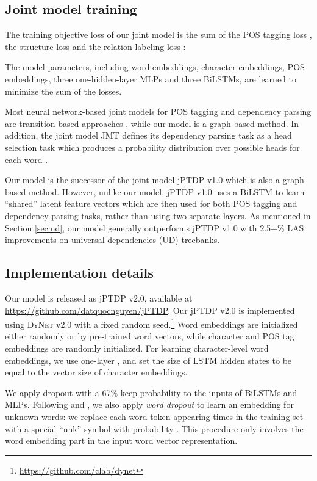\documentclass[11pt,letterpaper]{article}
\begin{document}
\subsection{Joint model training}

The  training objective loss of our joint model is  the sum of the
POS tagging loss , the structure loss  and
the  relation labeling loss : 



\noindent The model parameters, including word embeddings, character
embeddings, POS  embeddings, three one-hidden-layer MLPs and three BiLSTMs, are
learned  to minimize the sum   of the losses.

Most neural network-based joint models for  POS tagging and dependency parsing are transition-based approaches \citep{alberti-EtAl:2015:EMNLP,zhang-weiss:2016:P16-1,YangZLSYF18}, while our model is a graph-based method. In addition, the joint model JMT \citep{hashimoto-EtAl:2017:EMNLP2017} defines its dependency parsing task as a head selection task which produces a probability distribution over possible heads for each word \citep{zhang-cheng-lapata:2017:EACLlong}. 

Our   model is the successor of the joint model jPTDP v1.0 \citep{nguyen-dras-johnson:2017:K17-3} which is also  a graph-based method.  However, unlike our  model, jPTDP v1.0 uses a BiLSTM to learn ``shared'' latent feature vectors which are then used for both  POS tagging and dependency parsing tasks, 
rather than using two separate layers.
As mentioned in Section \ref{sec:ud}, our  model generally outperforms jPTDP v1.0 with 2.5+\% LAS  improvements on universal dependencies (UD) treebanks.

\subsection{Implementation details}\label{ssec:implement}

Our model  is released as jPTDP v2.0, available  at \url{https://github.com/datquocnguyen/jPTDP}. Our jPTDP v2.0 is implemented using  \textsc{DyNet} v2.0 \citep{dynet} with a fixed random seed.\footnote{\url{https://github.com/clab/dynet}}  Word embeddings are initialized either randomly or by pre-trained word vectors, while character and POS tag embeddings are randomly initialized. For learning character-level word embeddings, we use one-layer , and  set the size of LSTM hidden states  to be equal to the vector size of character embeddings.  

We  apply dropout \citep{JMLR:v15:srivastava14a} with a 67\% keep probability to the inputs of  BiLSTMs and MLPs. Following \citet{iyyer-EtAl:2015:ACL-IJCNLP} and \citet{TACL885},  we also apply \textit{word dropout} to learn  an embedding for unknown words: we replace each word token  appearing  times in the training set  with a special ``unk'' symbol with probability . This procedure only involves the word embedding part in the input word vector representation.
\end{document}
